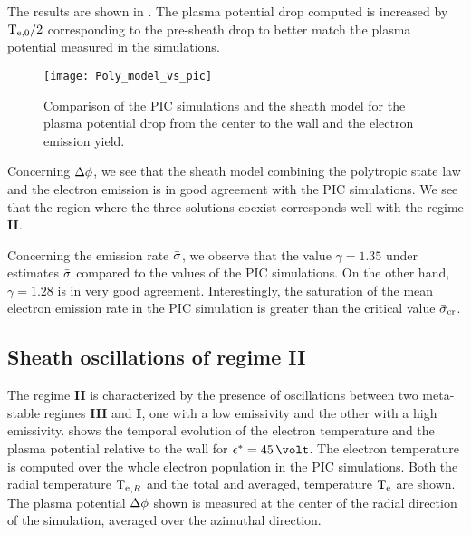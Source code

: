     The results are shown in .
    The plasma potential drop computed is increased by $\mathrm{T_{e, 0}}/2$ corresponding to the pre-sheath drop to better match the plasma potential measured in the simulations.

    \begin{figure}[hbtp]
      \centering
      \texttt{[image: Poly\_model\_vs\_pic]}
      \caption{Comparison of the PIC simulations and the sheath model for the plasma potential drop from the center to the wall and the electron emission yield. }
      \label{fig-Poly_model_vs_pic}
    \end{figure}

    Concerning $\Delta \phi$, we see that the sheath model combining the polytropic state law and the electron emission is in good agreement with the \ac{PIC} simulations.
    We see that the region where the three solutions coexist corresponds well with the regime {\bf II}.

    Concerning the emission rate $ \bar{\sigma }$, we observe that the value $\gamma=1.35$ under estimates $ \bar{\sigma }$ compared to the values of the \ac{PIC} simulations.
    On the other hand, $\gamma=1.28$ is in very good agreement.
    Interestingly, the saturation of the mean electron emission rate in the \ac{PIC} simulation is greater than the critical value $ \bar{\sigma }_{\rm cr}$.
    
    
  \subsection{Sheath oscillations of regime {\bf II}} \label{subsec-pic_scheath_RSO}
  
    The regime {\bf II} is characterized by the presence of oscillations between two meta-stable regimes {\bf III} and {\bf I}, one with a low emissivity and the other with a high emissivity.
     shows the temporal evolution of the electron temperature and the plasma potential relative to the wall for $\crover=45\,\volt$.
    The electron temperature is computed over the whole electron population in the \ac{PIC} simulations.
    Both the radial temperature $\mathrm{T_e}_{,R}$ and the total and averaged, temperature $\mathrm{T_e}$ are shown.
    The plasma potential $\Delta \phi$ shown is measured at the center of the radial direction of the simulation, averaged over the azimuthal direction.
    
